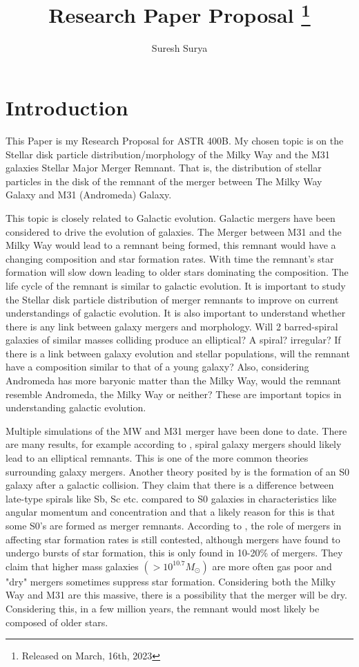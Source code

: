 \documentclass[linenumbers, preprint, times]{aastex631}
\begin{document}
\title{Research Paper Proposal
\footnote{Released on March, 16th, 2023}}

\author{Suresh Surya}
\section{Introduction} \label{sec:style}
This Paper is my Research Proposal for ASTR 400B. My chosen topic is
on the Stellar disk particle distribution/morphology of the Milky Way and the M31 galaxies
Stellar Major Merger Remnant. That is, the distribution of stellar particles in the disk of the
remnant of the merger between The Milky Way Galaxy and M31 (Andromeda) Galaxy.\par
This topic is closely related to Galactic evolution. Galactic mergers have been considered to drive the evolution of galaxies.  The Merger between M31 and the Milky Way would lead to a remnant being formed, this remnant would have a changing composition and star formation rates. 
With time the remnant's star formation will slow down leading to older stars dominating the composition. The life cycle of
the remnant is similar to galactic evolution. It is important to study the Stellar disk particle distribution of merger
remnants to improve on current understandings of galactic evolution. It is also important to understand whether there is 
any link between galaxy mergers and morphology. Will 2 barred-spiral galaxies of similar masses colliding produce an elliptical? A spiral? irregular? If there is a link between galaxy evolution and stellar populations, will the
remnant have a composition similar to that of a young galaxy? Also, considering Andromeda has more baryonic matter than the Milky Way, would the remnant resemble Andromeda, the Milky Way or neither? These are important topics in understanding
galactic evolution.\par
Multiple simulations of the MW and M31 merger have been done to date. There are many results, for example according to \citet{Toomre_1972}, spiral galaxy mergers should likely lead to an elliptical remnants. This is one of the more common theories surrounding galaxy mergers. Another theory posited by \citet{Querejeta_2015} is the formation of an S0 galaxy after a galactic collision. They claim that there is a difference between late-type spirals like Sb, Sc etc. compared to S0 galaxies in characteristics like angular momentum and concentration and that a likely reason for this is that some S0's are formed as merger remnants. According to \citet{Pearson_2019}, the role of mergers in affecting star formation rates is still contested, although mergers have found to undergo bursts of star formation, this is only found in 10-20\% of mergers. They claim that higher mass galaxies $(> 10^{10.7}M_\odot)$ are more often gas poor and "dry" mergers sometimes suppress star formation. Considering both the Milky Way and M31 are this massive, there is a possibility that the merger will be dry. Considering this, in a few million years, the remnant would most likely be composed of older stars.\par
\end{document}
